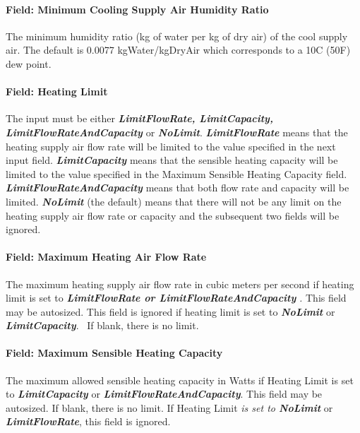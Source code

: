 \paragraph{Field: Minimum Cooling Supply Air Humidity Ratio}\label{field-minimum-cooling-supply-air-humidity-ratio-000}

The minimum humidity ratio (kg of water per kg of dry air) of the cool supply air. The default is 0.0077 kgWater/kgDryAir which corresponds to a 10\si{C} (50F) dew point.

\paragraph{Field: Heating Limit}\label{field-heating-limit-000}

The input must be either \textbf{\emph{LimitFlowRate, LimitCapacity, LimitFlowRateAndCapacity}} or \textbf{\emph{NoLimit}}. \textbf{\emph{LimitFlowRate}} means that the heating supply air flow rate will be limited to the value specified in the next input field. \textbf{\emph{LimitCapacity}} means that the sensible heating capacity will be limited to the value specified in the Maximum Sensible Heating Capacity field. \textbf{\emph{LimitFlowRateAndCapacity}} means that both flow rate and capacity will be limited. \textbf{\emph{NoLimit}} (the default) means that there will not be any limit on the heating supply air flow rate or capacity and the subsequent two fields will be ignored.

\paragraph{Field: Maximum Heating Air Flow Rate}\label{field-maximum-heating-air-flow-rate-001}

The maximum heating supply air flow rate in cubic meters per second if heating limit is set to \textbf{\emph{LimitFlowRate or LimitFlowRateAndCapacity}} \emph{.} This field may be autosized. This field is ignored if heating limit is set to \textbf{\emph{NoLimit}} or \textbf{\emph{LimitCapacity}}.~ If blank, there is no limit.

\paragraph{Field: Maximum Sensible Heating Capacity}\label{field-maximum-sensible-heating-capacity-000}

The maximum allowed sensible heating capacity in Watts if Heating Limit is set to \textbf{\emph{LimitCapacity}} or \textbf{\emph{LimitFlowRateAndCapacity}}. This field may be autosized. If blank, there is no limit. If Heating Limit \emph{is set to \textbf{NoLimit}} or \textbf{\emph{LimitFlowRate}}, this field is ignored.

